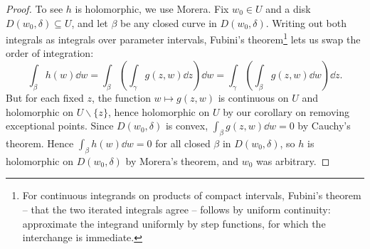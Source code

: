 \documentclass[a4paper]{scrartcl}
\begin{document}
\begin{proof}
    To see $h$ is holomorphic, we use Morera. Fix $w_0 \in U$ and a disk $D(w_0, \delta) \subseteq U$, and let $\beta$ be any closed curve in $D(w_0, \delta)$. Writing out both integrals as integrals over parameter intervals, Fubini's theorem\footnote{For continuous integrands on products of compact intervals, Fubini's theorem -- that the two iterated integrals agree -- follows by uniform continuity: approximate the integrand uniformly by step functions, for which the interchange is immediate.} lets us swap the order of integration:
    $$
    \int_\beta h(w) \dd w = \int_\beta \left(\int_\gamma g(z, w) \dd z \right) \dd w = \int_\gamma \left(\int_\beta g(z, w) \dd w\right) \dd z.
    $$
    But for each fixed $z$, the function $w \mapsto g(z, w)$ is continuous on $U$ and holomorphic on $U \backslash \{z\}$, hence holomorphic on $U$ by our corollary on removing exceptional points. Since $D(w_0, \delta)$ is convex, $\int_\beta g(z, w) \dd w = 0$ by Cauchy's theorem. Hence $\int_\beta h(w) \dd w = 0$ for all closed $\beta$ in $D(w_0, \delta)$, so $h$ is holomorphic on $D(w_0, \delta)$ by Morera's theorem, and $w_0$ was arbitrary.
\end{proof}
\end{document}
